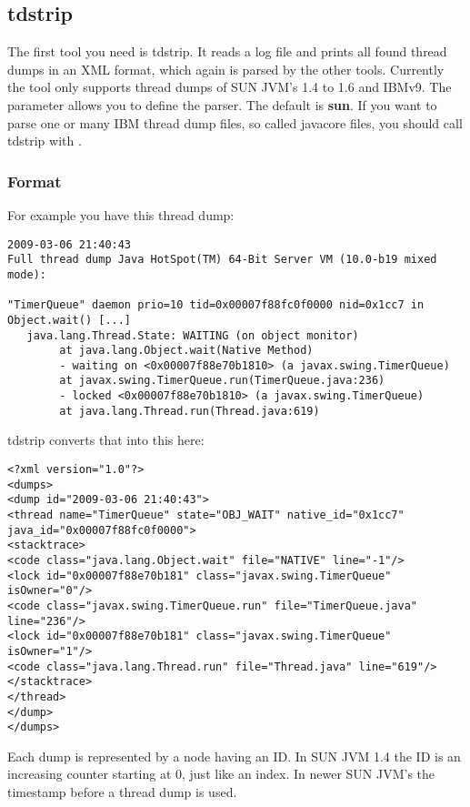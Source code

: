 \subsection{tdstrip}

The first tool you need is tdstrip.
It reads a log file and prints all found thread dumps in an XML format, which again is parsed by the other tools.
Currently the tool only supports thread dumps of SUN JVM's 1.4 to 1.6 and IBMv9.
The  parameter allows you to define the parser.
The default is \textbf{sun}.
If you want to parse one or many IBM thread dump files, so called javacore files, you should call tdstrip with .

\subsubsection{Format}

For example you have this thread dump:
\begin{lstlisting}
2009-03-06 21:40:43
Full thread dump Java HotSpot(TM) 64-Bit Server VM (10.0-b19 mixed mode):

"TimerQueue" daemon prio=10 tid=0x00007f88fc0f0000 nid=0x1cc7 in Object.wait() [...]
   java.lang.Thread.State: WAITING (on object monitor)
        at java.lang.Object.wait(Native Method)
        - waiting on <0x00007f88e70b1810> (a javax.swing.TimerQueue)
        at javax.swing.TimerQueue.run(TimerQueue.java:236)
        - locked <0x00007f88e70b1810> (a javax.swing.TimerQueue)
        at java.lang.Thread.run(Thread.java:619)
\end{lstlisting}

tdstrip converts that into this here:
\begin{lstlisting}
<?xml version="1.0"?>
<dumps>
<dump id="2009-03-06 21:40:43">
<thread name="TimerQueue" state="OBJ_WAIT" native_id="0x1cc7" java_id="0x00007f88fc0f0000">
<stacktrace>
<code class="java.lang.Object.wait" file="NATIVE" line="-1"/>
<lock id="0x00007f88e70b181" class="javax.swing.TimerQueue" isOwner="0"/>
<code class="javax.swing.TimerQueue.run" file="TimerQueue.java" line="236"/>
<lock id="0x00007f88e70b181" class="javax.swing.TimerQueue" isOwner="1"/>
<code class="java.lang.Thread.run" file="Thread.java" line="619"/>
</stacktrace>
</thread>
</dump>
</dumps>
\end{lstlisting}

Each dump is represented by a  node having an ID.
In SUN JVM 1.4 the ID is an increasing counter starting at 0, just like an index.
In newer SUN JVM's the timestamp before a thread dump is used.

